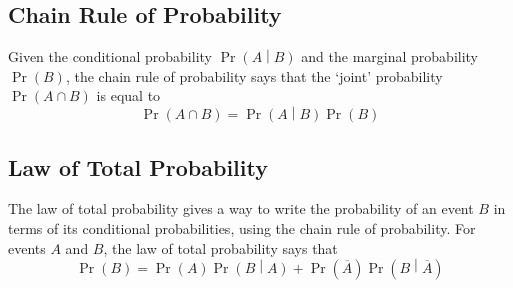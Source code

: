\documentclass[11pt]{report} %
\begin{document}
\subsection{Chain Rule of Probability}

Given the conditional probability $\operatorname{Pr}\left(A\middle|B\right)$ and the marginal probability $\operatorname{Pr}\left(B\right)$, the chain rule of probability says that the `joint' probability $\operatorname{Pr}\left(A\cap B\right)$ is equal to
\begin{equation}
\operatorname{Pr}\left(A\cap B\right) = \operatorname{Pr}\left(A\middle|B\right)\operatorname{Pr}\left(B\right)
\end{equation}

\subsection{Law of Total Probability}

The law of total probability gives a way to write the probability of an event $B$ in terms of its conditional probabilities, using the chain rule of probability. For events $A$ and $B$, the law of total probability says that
\begin{equation}
\operatorname{Pr}\left(B\right) = \operatorname{Pr}\left(A\right)\operatorname{Pr}\left(B\middle|A\right) + \operatorname{Pr}\left(\overline{A}\right)\operatorname{Pr}\left(B\middle|\overline{A}\right)
\end{equation}
\end{document}
